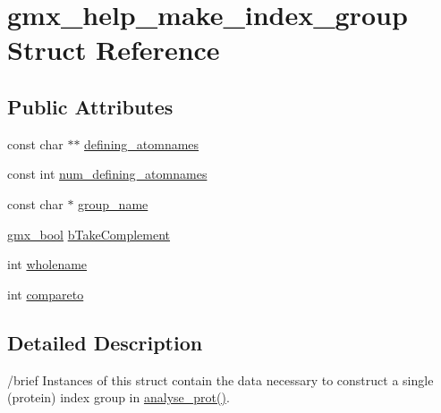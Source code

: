 \hypertarget{structgmx__help__make__index__group}{\section{gmx\-\_\-help\-\_\-make\-\_\-index\-\_\-group \-Struct \-Reference}
\label{structgmx__help__make__index__group}
}
\subsection*{\-Public \-Attributes}
\begin{DoxyCompactItemize}
\item 
const char $\ast$$\ast$ \hyperlink{structgmx__help__make__index__group_ad6a6a6ab8817f747bddfcb55cbd370f1}{defining\-\_\-atomnames}
\item 
const int \hyperlink{structgmx__help__make__index__group_a375ec9a0be0ca152a884bf0ec616a708}{num\-\_\-defining\-\_\-atomnames}
\item 
const char $\ast$ \hyperlink{structgmx__help__make__index__group_a235e40c456688435f998666db85e076d}{group\-\_\-name}
\item 
\hyperlink{include_2types_2simple_8h_a8fddad319f226e856400d190198d5151}{gmx\-\_\-bool} \hyperlink{structgmx__help__make__index__group_a3d76b77c8bff3f85b0082316815cc566}{b\-Take\-Complement}
\item 
int \hyperlink{structgmx__help__make__index__group_aed7614d311ad5b8f088cdbf4e08dfaea}{wholename}
\item 
int \hyperlink{structgmx__help__make__index__group_a74a6ccc8ed0c45e3a1f742520ffaebb4}{compareto}
\end{DoxyCompactItemize}


\subsection{\-Detailed \-Description}
/brief \-Instances of this struct contain the data necessary to construct a single (protein) index group in \hyperlink{index_8c_ac025ebd815654dc5c2a0535110a0edc2}{analyse\-\_\-prot()}. 

